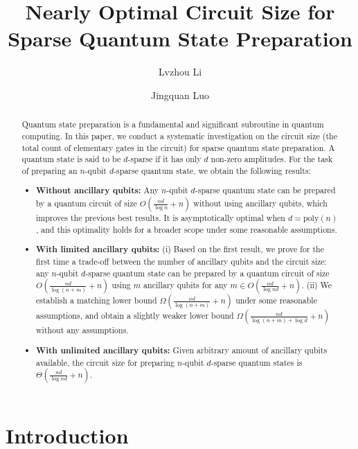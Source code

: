 \documentclass[a4paper,UKenglish,cleveref, autoref, thm-restate]{lipics-v2021}
\title{Nearly Optimal Circuit Size for Sparse Quantum State Preparation}
\author{Lvzhou Li}{Institute of Quantum Computing and Software, School of Computer Science and Engineering, Sun Yat-sen University, Guangzhou 510006, China}{lilvzh@mail.sysu.edu.cn}{https://orcid.org/0000-0001-5941-7036}{}
\author{Jingquan Luo}{Institute of Quantum Computing and Software, School of Computer Science and Engineering, Sun Yat-sen University, Guangzhou 510006, China}{luojq25@mail2.sysu.edu.cn}{https://orcid.org/0009-0003-7757-9858}{}
\begin{document}
\maketitle

\begin{abstract}
Quantum state preparation is a fundamental and significant  subroutine in quantum computing. In this paper, we conduct a systematic investigation on the circuit size (the total count of elementary gates in the circuit) for sparse quantum state preparation. A quantum state is said to be $d$-sparse if it has only  $d$ non-zero amplitudes. 
For the task of preparing an $n$-qubit $d$-sparse quantum state, we obtain the following results:
\begin{itemize}
   \item \textbf{Without ancillary qubits:}  
   Any $n$-qubit $d$-sparse quantum state can be prepared by a quantum circuit of size $O(\frac{nd}{\log n} + n)$ without using ancillary qubits, which improves the previous best results. It  is asymptotically optimal when $d = \mathrm{poly}(n)$, and this optimality holds for a broader scope under some reasonable assumptions.
 \item \textbf{With limited ancillary qubits:} (i) Based on the first result, we prove for the first time a trade-off between the number of ancillary qubits and the circuit size: any $n$-qubit $d$-sparse quantum state can be prepared by a quantum circuit of size $O(\frac{nd}{\log (n + m)} + n)$ using $m$ ancillary qubits for any $m \in O(\frac{nd}{\log nd} + n)$. 
  (ii) We establish a matching lower bound  $\Omega(\frac{nd}{\log {(n + m)} }+ n)$ under some reasonable assumptions, and  obtain a slightly weaker lower bound $\Omega(\frac{nd}{\log {(n + m)} + \log d} + n)$ without any assumptions. 
 

 \item   \textbf{With unlimited ancillary qubits:} Given arbitrary amount of ancillary qubits available, the circuit size for preparing $n$-qubit $d$-sparse quantum states is $\Theta(\frac{nd}{\log nd} + n)$.
\end{itemize}

\end{abstract}

\section{Introduction}
\end{document}
